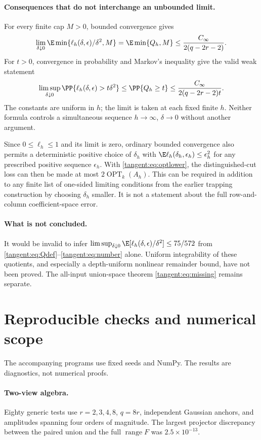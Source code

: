 \documentclass[11pt,oneside,openany,a4paper]{book}
\numberwithin{equation}{chapter}
\theoremstyle{definition}
\theoremstyle{remark}
\DeclareMathOperator{\ran}{range}\DeclareMathOperator{\OPT}{OPT}
\begin{document}
\paragraph{Consequences that do not interchange an unbounded limit.}
For every finite cap $M>0$, bounded convergence gives
\[
 \lim_{\delta\downarrow0}\E\min\{\ell_h(\delta,\epsilon)/\delta^2,M\}
 =\E\min\{Q_h,M\}\le\frac{C_\infty}{2(q-2r-2)}.
\]
For $t>0$, convergence in probability and Markov's inequality give the valid weak statement
\[
 \limsup_{\delta\downarrow0}\PP\{\ell_h(\delta,\epsilon)>t\delta^2\}
 \le\PP\{Q_h\ge t\}\le\frac{C_\infty}{2(q-2r-2)t}.
\]
The constants are uniform in $h$; the limit is taken at each fixed finite $h$. Neither formula controls a simultaneous sequence $h\to\infty$, $\delta\to0$ without another argument.

Since $0\le\ell_h\le1$ and its limit is zero, ordinary bounded convergence also permits a deterministic positive choice of $\delta_h$ with $\E\ell_h(\delta_h,\epsilon_h)\le\epsilon_h^2$ for any prescribed positive sequence $\epsilon_h$. With \eqref{tangent:eq:optlower}, the distinguished-cut loss can then be made at most $2\OPT_k(A_h)$. This can be required in addition to any finite list of one-sided limiting conditions from the earlier trapping construction by choosing $\delta_h$ smaller. It is not a statement about the full row-and-column coefficient-space error.

\paragraph{What is not concluded.}
It would be invalid to infer
$\limsup_{\delta\downarrow0}\E[\ell_h(\delta,\epsilon)/\delta^2]\le75/572$
from \eqref{tangent:eq:Qdef}--\eqref{tangent:eq:number} alone. Uniform integrability of these quotients, and especially a depth-uniform nonlinear remainder bound, have not been proved. The all-input union-space theorem \eqref{tangent:eq:missing} remains separate.

\section{Reproducible checks and numerical scope}
The accompanying programs use fixed seeds and NumPy. The results are diagnostics, not numerical proofs.

\paragraph{Two-view algebra.}
Eighty generic tests use $r=2,3,4,8$, $q=8r$, independent Gaussian anchors, and amplitudes spanning four orders of magnitude. The largest projector discrepancy between the paired union and the full $\ran F$ was $2.5\times10^{-13}$.
\end{document}
